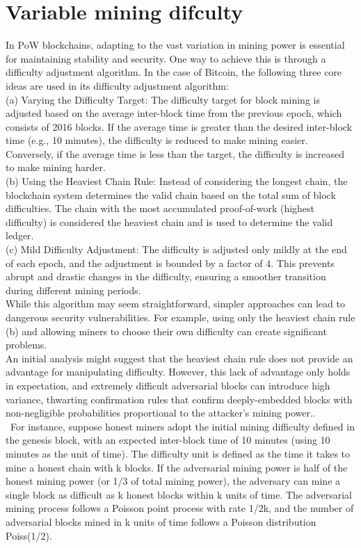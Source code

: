 \documentclass{report}
\begin{document}
\section{Variable mining difculty}
In PoW blockchains, adapting to the vast variation in mining power is essential for maintaining stability and security. One way to achieve this is through a difficulty adjustment algorithm. In the case of Bitcoin, the following three core ideas are used in its difficulty adjustment algorithm:\\
(a) Varying the Difficulty Target: The difficulty target for block mining is adjusted based on the average inter-block time from the previous epoch, which consists of 2016 blocks. If the average time is greater than the desired inter-block time (e.g., 10 minutes), the difficulty is reduced to make mining easier. Conversely, if the average time is less than the target, the difficulty is increased to make mining harder.\\
(b) Using the Heaviest Chain Rule: Instead of considering the longest chain, the blockchain system determines the valid chain based on the total sum of block difficulties. The chain with the most accumulated proof-of-work (highest difficulty) is considered the heaviest chain and is used to determine the valid ledger.\\
(c) Mild Difficulty Adjustment: The difficulty is adjusted only mildly at the end of each epoch, and the adjustment is bounded by a factor of 4. This prevents abrupt and drastic changes in the difficulty, ensuring a smoother transition during different mining periods.\\
While this algorithm may seem straightforward, simpler approaches can lead to dangerous security vulnerabilities. For example, using only the heaviest chain rule (b) and allowing miners to choose their own difficulty can create significant problems.\\
An initial analysis might suggest that the heaviest chain rule does not provide an advantage for manipulating difficulty. However, this lack of advantage only holds in expectation, and extremely difficult adversarial blocks can introduce high variance, thwarting confirmation rules that confirm deeply-embedded blocks with non-negligible probabilities proportional to the attacker's mining power\cite{reference1}..\\\
For instance, suppose honest miners adopt the initial mining difficulty defined in the genesis block, with an expected inter-block time of 10 minutes (using 10 minutes as the unit of time). The difficulty unit is defined as the time it takes to mine a honest chain with k blocks. If the adversarial mining power is half of the honest mining power (or 1/3 of total mining power), the adversary can mine a single block as difficult as k honest blocks within k units of time. The adversarial mining process follows a Poisson point process with rate 1/2k, and the number of adversarial blocks mined in k units of time follows a Poisson distribution Poiss(1/2).\\
\end{document}
